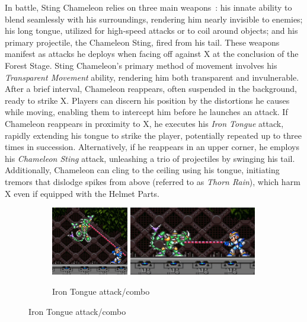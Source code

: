 In battle, Sting Chameleon relies on three main weapons~\cite{wiki:Sting_chameleon}: his innate ability to blend seamlessly with his surroundings, rendering him nearly invisible to enemies; his long tongue, utilized for high-speed attacks or to coil around objects; and his primary projectile, the Chameleon Sting, fired from his tail. These weapons manifest as attacks he deploys when facing off against X at the conclusion of the Forest Stage. Sting Chameleon's primary method of movement involves his \emph{Transparent Movement} ability, rendering him both transparent and invulnerable. After a brief interval, Chameleon reappears, often suspended in the background, ready to strike X. Players can discern his position by the distortions he causes while moving, enabling them to intercept him before he launches an attack. If Chameleon reappears in proximity to X, he executes his \emph{Iron Tongue} attack, rapidly extending his tongue to strike the player, potentially repeated up to three times in succession. Alternatively, if he reappears in an upper corner, he employs his \emph{Chameleon Sting} attack, unleashing a trio of projectiles by swinging his tail. Additionally, Chameleon can cling to the ceiling using his tongue, initiating tremors that dislodge spikes from above (referred to as \emph{Thorn Rain}), which harm X even if equipped with the Helmet Parts.
\begin{figure}[htp]
	\centering
	\begin{subfigure}{\linewidth}
		\centering
		\includegraphics[height=3cm]{figures/X1/Sting_chameleon/Chameleon_tongue_1.jpg}
		\includegraphics[height=3cm]{figures/X1/Sting_chameleon/Chameleon_tongue_2.jpg}
		\caption{Iron Tongue attack/combo}
	\end{subfigure}
\end{figure}
